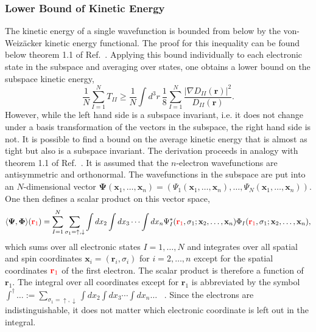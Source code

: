 \documentclass[journal=jpclcd,manuscript=letter]{achemso}
\renewcommand\vec[1]{\mathbf{#1}}
\begin{document}
\subsubsection{Lower Bound of Kinetic Energy}
The kinetic energy of a single wavefunction is bounded from below by the von-Weiz\"{a}cker kinetic energy functional.
The proof for this inequality can be found below theorem 1.1 of Ref.~\cite{Lieb2002}. Applying this bound individually
to each electronic state in the subspace and averaging over states, one obtains a lower bound on the subspace kinetic energy,
\begin{equation}
 \frac{1}{N} \sum_{I=1}^{N} T_{II} \ge \frac{1}{N} \int d^3r ~ \frac{1}{8} \sum_{I=1}^{N} \frac{\vert \nabla D_{II}(\vec{r}) \vert^2}{D_{II}(\vec{r})}.
 \label{eqn:lower_bound_kinetic_sum_over_states}
\end{equation}
However, while the left hand side is a subspace invariant, i.e. it does not change under a basis transformation of the vectors in the subspace,
the right hand side is not. It is possible to find a bound on the average kinetic energy that is almost as tight but also is a subspace invariant.
The derivation proceeds in analogy with theorem 1.1 of Ref.~\cite{Lieb2002}. It is assumed that the $n$-electron wavefunctions are antisymmetric and orthonormal.
The wavefunctions in the subspace are put into an $N$-dimensional vector
$\vec{\Psi}(\vec{x}_1,\ldots,\vec{x}_n) = \left(\Psi_1(\vec{x}_1,\ldots,\vec{x}_n), \ldots, \Psi_N(\vec{x}_1,\ldots,\vec{x}_n)\right)$. One then defines
a scalar product on this vector space,
\begin{equation}
\langle \vec{\Psi}, \vec{\Phi} \rangle({\color{red} \vec{r}_1}) = \sum_{I=1}^{N} \sum_{\sigma_1=\uparrow,\downarrow} \int dx_2 \int dx_3 \cdots \int dx_n
  \Psi_I^*({\color{red} \vec{r}_1},\sigma_1;\vec{x}_2,\ldots,\vec{x}_n)
  \Phi_I({\color{red} \vec{r}_1},\sigma_1;\vec{x}_2,\ldots,\vec{x}_n),
\end{equation}
which sums over all electronic states $I=1,\ldots,N$ and integrates over all spatial and spin coordinates $\vec{x}_i = (\vec{r}_i,\sigma_i)$ for $i=2,\ldots,n$
except for the spatial coordinates ${\color{red} \vec{r}_1}$
of the first electron. The scalar product is therefore a function of $\vec{r}_1$. The integral over all coordinates except for $\vec{r}_1$ is abbreviated
by the symbol $\int^{\dagger} \ldots := \sum_{\sigma_1=\uparrow,\downarrow} \int dx_2 \int dx_3 \cdots \int dx_n \ldots$ ~.
Since the electrons are indistinguishable, it does not matter which electronic coordinate is left out in the integral.
\end{document}
